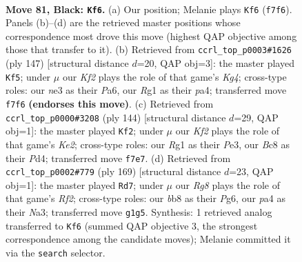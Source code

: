 \documentclass[11pt]{article}
\begin{document}
\clearpage

\begin{figure}[p]\centering
\begin{subfigure}{0.46\textwidth}\centering
\resizebox{\linewidth}{!}{%
\newchessgame
\chessboard[
  setfen={1Bb5/5k2/8/1P6/P3B3/2K1N2p/1R6/6r1 b - - 2 81},
  showmover=false,
  pgfstyle=straightmove, color=movearrow, markmove={f7-f6}
]}
\caption{}
\end{subfigure}\hfill
\begin{subfigure}{0.46\textwidth}\centering
\resizebox{\linewidth}{!}{%
\newchessgame
\chessboard[
  setfen={8/2B5/p7/2K3k1/P2R4/7r/4b3/8 b - - 4 74},
  showmover=false,
  pgfstyle=straightmove, color=movearrow, markmove={g5-f5}
]}
\caption{}
\end{subfigure}
\\[4pt]
\begin{subfigure}{0.46\textwidth}\centering
\resizebox{\linewidth}{!}{%
\newchessgame
\chessboard[
  setfen={5b2/2B5/8/3p3k/3Pb2p/4P2B/4K3/8 w - - 13 73},
  showmover=false,
  pgfstyle=straightmove, color=movearrow, markmove={e2-f2}
]}
\caption{}
\end{subfigure}\hfill
\begin{subfigure}{0.46\textwidth}\centering
\resizebox{\linewidth}{!}{%
\newchessgame
\chessboard[
  setfen={8/5r1p/6pB/8/8/n6P/1R4P1/3k2K1 b - - 43 85},
  showmover=false,
  pgfstyle=straightmove, color=movearrow, markmove={f7-d7}
]}
\caption{}
\end{subfigure}
\caption{\textbf{Move 81, Black: \texttt{Kf6}.} (a) Our position; Melanie plays \texttt{Kf6} (\texttt{f7f6}). Panels (b)--(d) are the retrieved master positions whose correspondence most drove this move (highest QAP objective among those that transfer to it). (b) Retrieved from \texttt{ccrl\_top\_p0003\#1626} (ply 147) [structural distance $d$=20, QAP obj=3]: the master played \texttt{Kf5}; under $\mu$ our \emph{Kf2} plays the role of that game's \emph{Kg4}; cross-type roles: our \emph{n}e3 as their \emph{P}a6, our \emph{R}g1 as their \emph{p}a4; transferred move \texttt{f7f6} \textbf{(endorses this move)}. (c) Retrieved from \texttt{ccrl\_top\_p0000\#3208} (ply 144) [structural distance $d$=29, QAP obj=1]: the master played \texttt{Kf2}; under $\mu$ our \emph{Kf2} plays the role of that game's \emph{Ke2}; cross-type roles: our \emph{R}g1 as their \emph{P}e3, our \emph{B}c8 as their \emph{P}d4; transferred move \texttt{f7e7}. (d) Retrieved from \texttt{ccrl\_top\_p0002\#779} (ply 169) [structural distance $d$=23, QAP obj=1]: the master played \texttt{Rd7}; under $\mu$ our \emph{Rg8} plays the role of that game's \emph{Rf2}; cross-type roles: our \emph{b}b8 as their \emph{P}g6, our \emph{p}a4 as their \emph{N}a3; transferred move \texttt{g1g5}. Synthesis: 1 retrieved analog transferred to \texttt{Kf6} (summed QAP objective 3, the strongest correspondence among the candidate moves); Melanie committed it via the \texttt{search} selector.}
\label{fig:thought-m161}
\end{figure}
\end{document}
